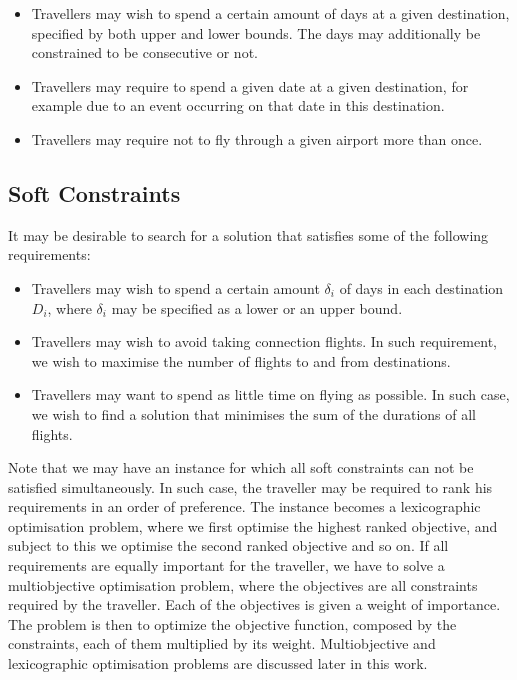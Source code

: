 \documentclass{mprop}
\theoremstyle{definition}
\begin{document}
\begin{itemize}
\item Travellers may wish to spend a certain amount of days at a given destination, specified by both upper and lower bounds. The days may additionally be constrained to be consecutive or not.

\item Travellers may require to spend a given date at a given destination, for example due to an event occurring on that date in this destination.

\item Travellers may require not to fly through a given airport more than once.
\end{itemize}

\subsection{Soft Constraints}
It may be desirable to search for a solution that satisfies some of the following requirements:

\begin{itemize}
\item Travellers may wish to spend a certain amount $\delta_{i}$ of days in each destination $D_{i}$, where $\delta_{i}$ may be specified as a lower or an upper bound.

\item Travellers may wish to avoid taking connection flights. In such requirement, we wish to maximise the number of flights to and from destinations.

\item Travellers may want to spend as little time on flying as possible. In such case, we wish to find a solution that minimises the sum of the durations of all flights.
\end{itemize}

Note that we may have an instance for which all soft constraints can not be satisfied simultaneously. In such case, the traveller may be required to rank his requirements in an order of preference. The instance becomes a lexicographic optimisation problem, where we first optimise the highest ranked objective, and subject to this we optimise the second ranked objective and so on.
If all requirements are equally important for the traveller, we have to solve a multiobjective optimisation problem, where the objectives are all constraints required by the traveller. Each of the objectives is given a weight of importance. The problem is then to optimize the objective function, composed by the constraints, each of them multiplied by its weight. Multiobjective and lexicographic optimisation problems are discussed later in this work. %
\end{document}
